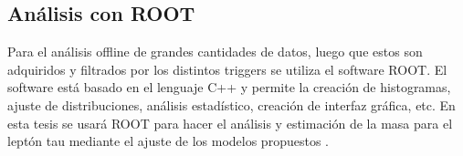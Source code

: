 \subsection{Análisis con ROOT}

Para el análisis offline de grandes cantidades de datos, luego que estos son adquiridos y filtrados por los distintos triggers se utiliza el software ROOT. El software está basado en el lenguaje C++ y permite la creación de histogramas, ajuste de distribuciones, análisis estadístico, creación de interfaz gráfica, etc. En esta tesis se usará ROOT para hacer el análisis y estimación de la masa para el leptón tau mediante el ajuste de los modelos propuestos \cite{Brun:1997pa}.